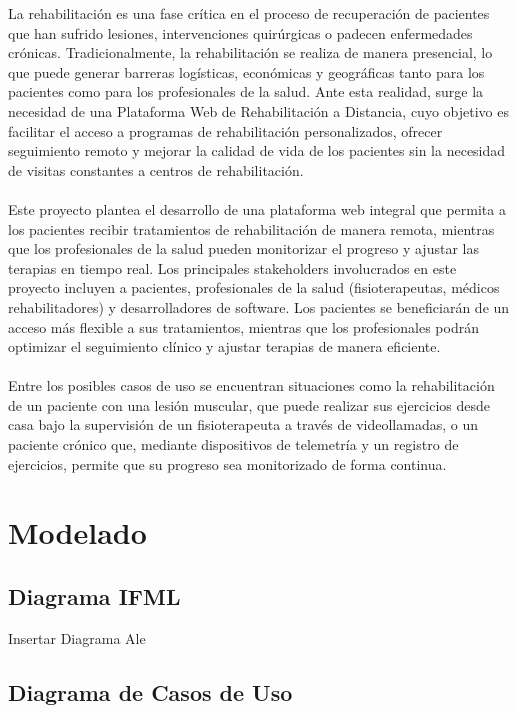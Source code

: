 \documentclass{article}
\begin{document}
La rehabilitación es una fase crítica en el proceso de recuperación de pacientes que han sufrido lesiones, intervenciones quirúrgicas o padecen enfermedades crónicas. Tradicionalmente, la rehabilitación se realiza de manera presencial, lo que puede generar barreras logísticas, económicas y geográficas tanto para los pacientes como para los profesionales de la salud. Ante esta realidad, surge la necesidad de una Plataforma Web de Rehabilitación a Distancia, cuyo objetivo es facilitar el acceso a programas de rehabilitación personalizados, ofrecer seguimiento remoto y mejorar la calidad de vida de los pacientes sin la necesidad de visitas constantes a centros de rehabilitación.
\\
\\
Este proyecto plantea el desarrollo de una plataforma web integral que permita a los pacientes recibir tratamientos de rehabilitación de manera remota, mientras que los profesionales de la salud pueden monitorizar el progreso y ajustar las terapias en tiempo real. Los principales stakeholders involucrados en este proyecto incluyen a pacientes, profesionales de la salud (fisioterapeutas, médicos rehabilitadores) y desarrolladores de software. Los pacientes se beneficiarán de un acceso más flexible a sus tratamientos, mientras que los profesionales podrán optimizar el seguimiento clínico y ajustar terapias de manera eficiente.
\\
\\
Entre los posibles casos de uso se encuentran situaciones como la rehabilitación de un paciente con una lesión muscular, que puede realizar sus ejercicios desde casa bajo la supervisión de un fisioterapeuta a través de videollamadas, o un paciente crónico que, mediante dispositivos de telemetría y un registro de ejercicios, permite que su progreso sea monitorizado de forma continua.


\section{Modelado}

\subsection{Diagrama IFML}

Insertar Diagrama Ale

\subsection{Diagrama de Casos de Uso}
\end{document}
